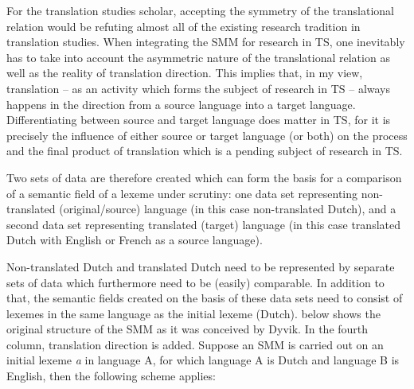 For the translation studies scholar, accepting the symmetry of the translational relation would be refuting almost all of the existing research tradition in translation studies. When integrating the SMM for research in TS, one inevitably has to take into account the asymmetric nature of the translational relation as well as the reality of translation direction. This implies that, in my view, translation – as an activity which forms the subject of research in TS – always happens in the direction from a source language into a target language. Differentiating between source and target language does matter in TS, for it is precisely the influence of either source or target language (or both) on the process and the final product of translation which is a pending subject of research in TS.

Two sets of data are therefore created which can form the basis for a comparison of a semantic field of a lexeme under scrutiny: one data set representing non-translated (original\slash source) language (in this case non-translated Dutch), and a second data set representing translated (target) language (in this case translated Dutch with English or French as a source language).

Non-translated Dutch and translated Dutch need to be represented by separate sets of data which furthermore need to be (easily) comparable. In addition to that, the semantic fields created on the basis of these data sets need to consist of lexemes in the same language as the initial lexeme (Dutch).  below shows the original structure of the SMM as it was conceived by Dyvik. In the fourth column, translation direction is added. Suppose an SMM is carried out on an initial lexeme \textit{a} in language A, for which language A is Dutch and language B is English, then the following scheme applies:

\begin{table}
\caption{\label{tab:3:1} Source and target language in the different steps of the SMM}

\end{table}
  
